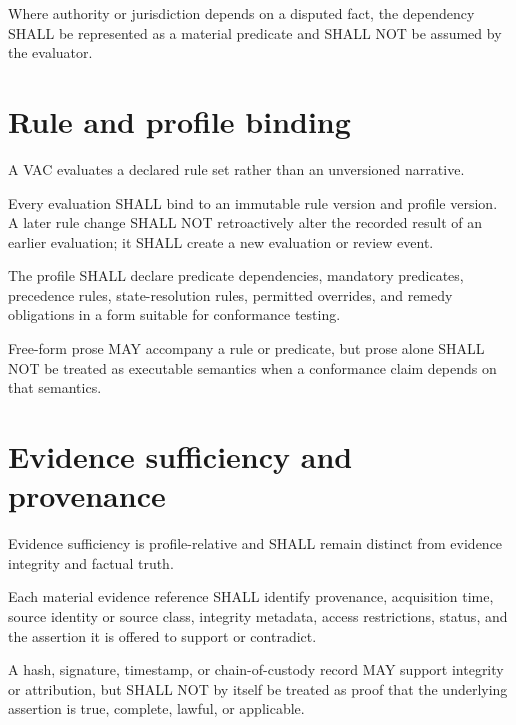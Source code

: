 \begin{requirement}[ACA-120-013]
Where authority or jurisdiction depends on a disputed fact, the dependency
SHALL be represented as a material predicate and SHALL NOT be assumed by the
evaluator.
\end{requirement}

\section{Rule and profile binding}
A VAC evaluates a declared rule set rather than an unversioned narrative.

\begin{requirement}[ACA-120-014]
Every evaluation SHALL bind to an immutable rule version and profile version.
A later rule change SHALL NOT retroactively alter the recorded result of an
earlier evaluation; it SHALL create a new evaluation or review event.
\end{requirement}

\begin{requirement}[ACA-120-015]
The profile SHALL declare predicate dependencies, mandatory predicates,
precedence rules, state-resolution rules, permitted overrides, and remedy
obligations in a form suitable for conformance testing.
\end{requirement}

\begin{requirement}[ACA-120-016]
Free-form prose MAY accompany a rule or predicate, but prose alone SHALL NOT be
treated as executable semantics when a conformance claim depends on that
semantics.
\end{requirement}

\section{Evidence sufficiency and provenance}
Evidence sufficiency is profile-relative and SHALL remain distinct from evidence
integrity and factual truth.

\begin{requirement}[ACA-120-017]
Each material evidence reference SHALL identify provenance, acquisition time,
source identity or source class, integrity metadata, access restrictions,
status, and the assertion it is offered to support or contradict.
\end{requirement}

\begin{requirement}[ACA-120-018]
A hash, signature, timestamp, or chain-of-custody record MAY support integrity
or attribution, but SHALL NOT by itself be treated as proof that the underlying
assertion is true, complete, lawful, or applicable.
\end{requirement}

